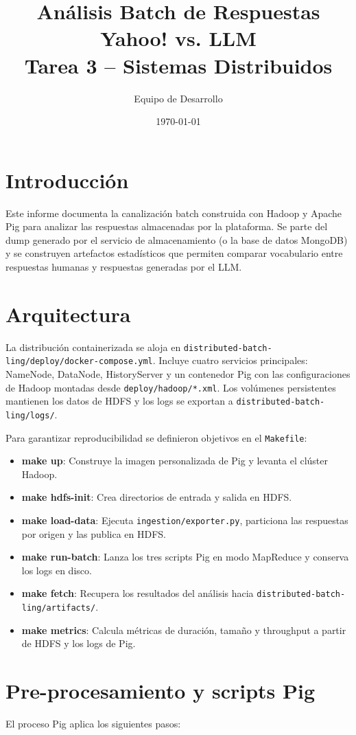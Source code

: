 \documentclass[11pt,a4paper]{article}
\title{Análisis Batch de Respuestas Yahoo! vs. LLM\\\large Tarea 3 -- Sistemas Distribuidos}
\author{Equipo de Desarrollo}
\date{\today}
\begin{document}
\maketitle

\section{Introducción}
Este informe documenta la canalización batch construida con Hadoop y Apache Pig para analizar las respuestas almacenadas por la plataforma. Se parte del dump generado por el servicio de almacenamiento (o la base de datos MongoDB) y se construyen artefactos estadísticos que permiten comparar vocabulario entre respuestas humanas y respuestas generadas por el LLM.

\section{Arquitectura}
La distribución containerizada se aloja en \texttt{distributed-batch-ling/deploy/docker-compose.yml}. Incluye cuatro servicios principales: NameNode, DataNode, HistoryServer y un contenedor Pig con las configuraciones de Hadoop montadas desde \texttt{deploy/hadoop/*.xml}. Los volúmenes persistentes mantienen los datos de HDFS y los logs se exportan a \texttt{distributed-batch-ling/logs/}.

Para garantizar reproducibilidad se definieron objetivos en el \texttt{Makefile}:

\begin{itemize}
  \item \textbf{make up}: Construye la imagen personalizada de Pig y levanta el clúster Hadoop.
  \item \textbf{make hdfs-init}: Crea directorios de entrada y salida en HDFS.
  \item \textbf{make load-data}: Ejecuta \texttt{ingestion/exporter.py}, particiona las respuestas por origen y las publica en HDFS.
  \item \textbf{make run-batch}: Lanza los tres scripts Pig en modo MapReduce y conserva los logs en disco.
  \item \textbf{make fetch}: Recupera los resultados del análisis hacia \texttt{distributed-batch-ling/artifacts/}.
  \item \textbf{make metrics}: Calcula métricas de duración, tamaño y throughput a partir de HDFS y los logs de Pig.
\end{itemize}

\section{Pre-procesamiento y scripts Pig}
El proceso Pig aplica los siguientes pasos:
\end{document}
